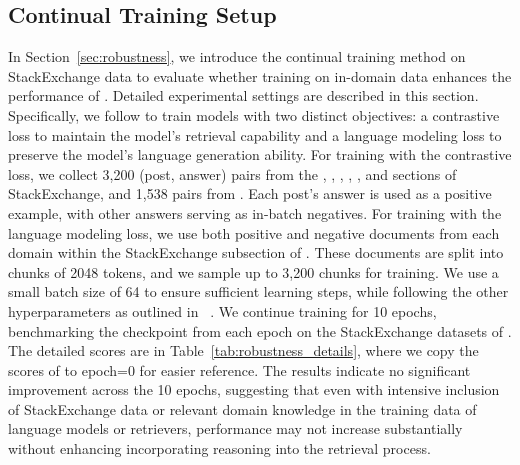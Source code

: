 \subsection{Continual Training Setup}
\label{app:continue_training}
In Section~\ref{sec:robustness}, we introduce the continual training method \grit on StackExchange data to evaluate whether training on in-domain data enhances the performance of \ours. Detailed experimental settings are described in this section. Specifically, we follow \grit to train models with two distinct objectives: a contrastive loss to maintain the model's retrieval capability and a language modeling loss to preserve the model's language generation ability. For training with the contrastive loss, we collect 3,200 (post, answer) pairs from the \biology, \earth, \econ, \psychology, \robotics, and \stackoverflow sections of StackExchange, and 1,538 pairs from \sustainable. Each post's answer is used as a positive example, with other answers serving as in-batch negatives. 
For training with the language modeling loss, we use both positive and negative documents from each domain within the StackExchange subsection of \ours{}. These documents are split into chunks of 2048 tokens, and we sample up to 3,200 chunks for training. We use a small batch size of 64 to ensure sufficient learning steps, while following the other hyperparameters as outlined in ~\citet{muennighoff2024generative}. We continue training \grit for 10 epochs, benchmarking the checkpoint from each epoch on the StackExchange datasets of \ours. The detailed scores are in Table~\ref{tab:robustness_details}, where we copy the scores of \grit to epoch=0 for easier reference. The results indicate no significant improvement across the 10 epochs, suggesting that even with intensive inclusion of StackExchange data or relevant domain knowledge in the training data of language models or retrievers, performance may not increase substantially without enhancing incorporating reasoning into the retrieval process.





